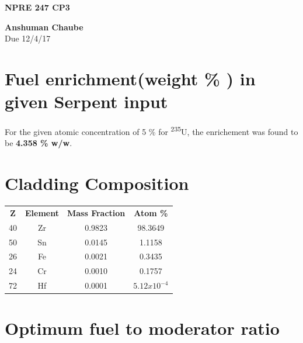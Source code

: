 \documentclass[14pt,a4paper]{article} %
\begin{document}
\begin{titlepage}
    \begin{center}
        
        \Huge
        \textbf{NPRE 247 CP3}
        
        \vspace{0.5cm}
        \LARGE

        \textbf{Anshuman Chaube}\\
        Due 12/4/17
       
 
                
    \end{center}
\end{titlepage}

%
\newpage


\section{Fuel enrichment(weight \% ) in given Serpent input}
For the given atomic concentration of 5 \% for \textsuperscript{235}U, the enrichement was found to be \textbf{4.358 \% w/w}.

\section{Cladding Composition}

\begin{tabular}{c c c c}

\textbf{Z} & \textbf{Element} & \textbf{Mass Fraction} & \textbf{Atom \%} \\
40         & Zr               &  0.9823                &   98.3649         \\
50         & Sn               &  0.0145                &    1.1158         \\
26         & Fe               &  0.0021                &    0.3435         \\
24         & Cr               &  0.0010                &    0.1757         \\
72         & Hf               &  0.0001                &   $5.12x10^{-4}$  \\
\end{tabular}

\section{Optimum fuel to moderator ratio}
\end{document}
